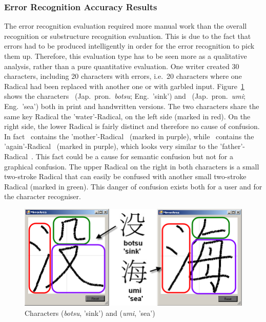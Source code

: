 \subsubsection{Error Recognition Accuracy Results}
\label{sec:eval:resulterrorrecognition}

The error recognition evaluation required more manual work than the overall 
recognition or substructure recognition evaluation. This is due to the fact
that errors had to be produced intelligently in order for the error recognition
to pick them up. Therefore, this evaluation type has to be seen more as a 
qualitative analysis, rather than a pure quantitative evaluation.
One writer created 30 characters, including 20 characters with errors,
i.e.\ 20 characters where one Radical had been replaced with another one
or with garbled input. Figure~\ref{fig:eval:botsuumiprintvsdrawn} shows the
characters~ (Jap.\ pron.\ \emph{botsu}; Eng.\ 'sink') %
and~ (Jap.\ pron.\ \emph{umi}; Eng.\ 'sea') %
both in print and handwritten versions.
The two characters share the same key Radical the 'water'-Radical, on the left
side (marked in red). On the right side, the lower Radical is fairly distinct
and therefore no cause of confusion. In fact~ contains the 
'mother'-Radical~ (marked in purple), 
while~ contains the 'again'-Radical~ (marked in purple), 
which looks very similar to the 'father'-Radical~.
This fact could be a cause for semantic confusion but not for a 
graphical confusion.
The upper Radical on the right in both characters is a small two-stroke
Radical that can easily be confused with another small two-stroke 
Radical (marked in green). This danger of confusion exists both for a user 
and for the character recogniser. 
\begin{figure}[htbp]
  \begin{center}
    \includegraphics[scale=0.75]{images/char935vsChar117HandwrittenMarked.png}
    \caption{Characters  (\emph{botsu}, 'sink') and  (\emph{umi}, 'sea')}
    \label{fig:eval:botsuumiprintvsdrawn}
  \end{center}
\end{figure}
